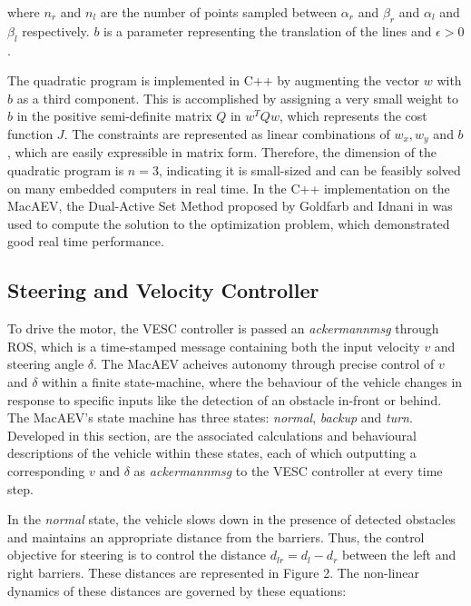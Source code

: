 \documentclass[conference]{IEEEtran}
\begin{document}
where $n_r$ and $n_l$ are the number of points sampled between $\alpha_r$ and $\beta_r$ and $\alpha_l$ and $\beta_l$ respectively. $b$ is a parameter representing the translation of the lines and $\epsilon > 0$.

The quadratic program is implemented in C++ by augmenting the vector $w$ with $b$ as a third component. This is accomplished by assigning a very small weight to $b$ in the positive semi-definite matrix $Q$ in $w^T Q w$, which represents the cost function $J$. The constraints are represented as linear combinations of $w_x, w_y$ and $b$, which are easily expressible in matrix form. Therefore, the dimension of the quadratic program is $n=3$, indicating it is  small-sized and can be feasibly solved on many embedded computers in real time. In the C++ implementation on the MacAEV, the Dual-Active Set Method proposed by Goldfarb and Idnani in \cite{b8} was used to compute the solution to the optimization problem, which demonstrated good real time performance. 


\subsection{Steering and Velocity Controller}
To drive the motor, the VESC controller is passed an \textit{ackermann\textunderscore msg} through ROS, which is a time-stamped message containing both the input velocity $v$ and steering angle $\delta$. The MacAEV acheives autonomy through precise control of $v$ and $\delta$ within a finite state-machine, where the behaviour of the vehicle changes in response to specific inputs like the detection of an obstacle in-front or behind. The MacAEV's state machine has three states: \textit{normal}, \textit{backup} and \textit{turn}. Developed in this section, are the associated calculations and behavioural descriptions of the vehicle within these states, each of which outputting a corresponding $v$ and $\delta$ as \textit{ackermann\textunderscore msg} to the VESC controller at every time step.  


In the \textit{normal} state, the vehicle slows down in the presence of detected obstacles and maintains an appropriate distance from the barriers. Thus, the control objective for steering is to control the distance $d_{lr} = d_l - d_r$ between the left and right barriers. These distances are represented in Figure 2. The non-linear dynamics of these distances are governed by these equations:
\end{document}
